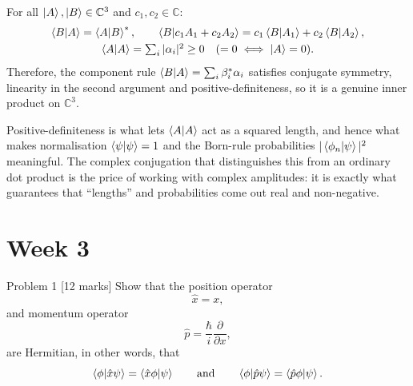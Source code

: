 \documentclass[12pt]{article}
\begin{document}
\begin{answerbox}
For all $\ket{A},\ket{B}\in\mathbb{C}^3$ and $c_1,c_2\in\mathbb{C}$:
\begin{gather*}
\braket{B|A}=\braket{A|B}^*,\qquad
\braket{B|c_1A_1+c_2A_2}=c_1\braket{B|A_1}+c_2\braket{B|A_2},\\
\braket{A|A}=\textstyle\sum_i|\alpha_i|^2\ge0\quad(=0\iff\ket{A}=0).
\end{gather*}
Therefore, the component rule $\braket{B|A}=\sum_i\beta_i^*\alpha_i$ satisfies conjugate symmetry, linearity in the second argument and positive-definiteness, so it is a genuine inner product on $\mathbb{C}^3$.
\end{answerbox}

\begin{insightbox}
Positive-definiteness is what lets $\braket{A|A}$ act as a squared length, and hence what makes normalisation $\braket{\psi|\psi}=1$ and the Born-rule probabilities $|\braket{\phi_n|\psi}|^2$ meaningful. The complex conjugation that distinguishes this from an ordinary dot product is the price of working with complex amplitudes: it is exactly what guarantees that ``lengths'' and probabilities come out real and non-negative.
\end{insightbox}
\fi


\newpage
\section{Week 3}

\begin{problembox}{Problem 1 \hfill [12 marks]}
Show that the position operator 
\[
\hat{x}=x,
\]
and momentum operator
\[
\hat{p}=\frac{\hbar}{i}\frac{\partial}{\partial x},
\]
are Hermitian, in other words, that
\[
\braket{\phi|\hat{x}\psi}=\braket{\hat{x}\phi|\psi}
\qquad\text{and}\qquad
\braket{\phi|\hat{p}\psi}=\braket{\hat{p}\phi|\psi}.
\]
\end{problembox}
\end{document}
